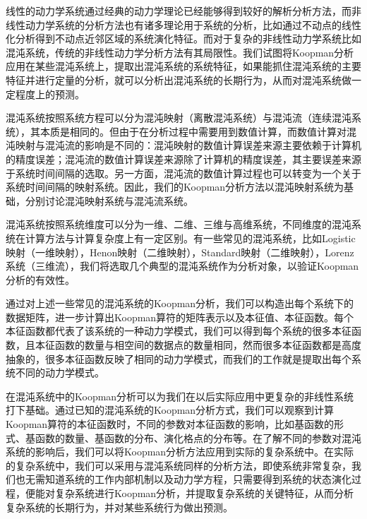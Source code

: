 线性的动力学系统通过经典的动力学理论已经能够得到较好的解析分析方法，而非线性动力学系统的分析方法也有诸多理论用于系统的分析，比如通过不动点的线性化分析得到不动点近邻区域的系统演化特征。而对于复杂的非线性动力学系统比如混沌系统，传统的非线性动力学分析方法有其局限性。我们试图将Koopman分析应用在某些混沌系统上，提取出混沌系统的系统特征，如果能抓住混沌系统的主要特征并进行定量的分析，就可以分析出混沌系统的长期行为，从而对混沌系统做一定程度上的预测。

混沌系统按照系统方程可以分为混沌映射（离散混沌系统）与混沌流（连续混沌系统），其本质是相同的。但由于在分析过程中需要用到数值计算，而数值计算对混沌映射与混沌流的影响是不同的：混沌映射的数值计算误差来源主要依赖于计算机的精度误差；混沌流的数值计算误差来源除了计算机的精度误差，其主要误差来源于系统时间间隔的选取。另一方面，混沌流的数值计算过程也可以转变为一个关于系统时间间隔的映射系统。因此，我们的Koopman分析方法以混沌映射系统为基础，分别讨论混沌映射系统与混沌流系统。

混沌系统按照系统维度可以分为一维、二维、三维与高维系统，不同维度的混沌系统在计算方法与计算复杂度上有一定区别。有一些常见的混沌系统，比如Logistic映射（一维映射），Henon映射（二维映射），Standard映射（二维映射），Lorenz系统（三维流），我们将选取几个典型的混沌系统作为分析对象，以验证Koopman分析的有效性。

通过对上述一些常见的混沌系统的Koopman分析，我们可以构造出每个系统下的数据矩阵，进一步计算出Koopman算符的矩阵表示以及本征值、本征函数。每个本征函数都代表了该系统的一种动力学模式，我们可以得到每个系统的很多本征函数，且本征函数的数量与相空间的数据点的数量相同，然而很多本征函数都是高度抽象的，很多本征函数反映了相同的动力学模式，而我们的工作就是提取出每个系统不同的动力学模式。

在混沌系统中的Koopman分析可以为我们在以后实际应用中更复杂的非线性系统打下基础。通过已知的混沌系统的Koopman分析方式，我们可以观察到计算Koopman算符的本征函数时，不同的参数对本征函数的影响，比如基函数的形式、基函数的数量、基函数的分布、演化格点的分布等。在了解不同的参数对混沌系统的影响后，我们可以将Koopman分析方法应用到实际的复杂系统中。在实际的复杂系统中，我们可以采用与混沌系统同样的分析方法，即使系统非常复杂，我们也无需知道系统的工作内部机制以及动力学方程，只需要得到系统的状态演化过程，便能对复杂系统进行Koopman分析，并提取复杂系统的关键特征，从而分析复杂系统的长期行为，并对某些系统行为做出预测。

